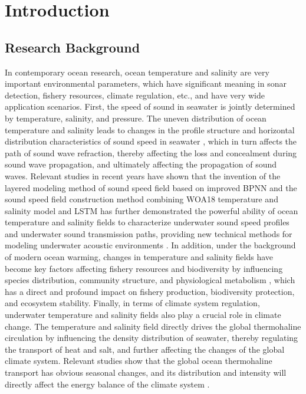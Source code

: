 \documentclass[webpdf,contemporary,large]{oup-authoring-template}
\begin{document}
\maketitle

\section{Introduction}

\subsection{Research Background}

In contemporary ocean research, ocean temperature and salinity are very important environmental parameters, which have significant meaning in sonar detection, fishery resources, climate regulation, etc., and have very wide application scenarios.
First, the speed of sound in seawater is jointly determined by temperature, salinity, and pressure. The uneven distribution of ocean temperature and salinity leads to changes in the profile structure and horizontal distribution characteristics of sound speed in seawater \cite{LiuYuLiangSanWeiHaiYangWenYanChangZhiNengYuBaoJiYingYongYanJiu2025}, which in turn affects the path of sound wave refraction, thereby affecting the loss and concealment during sound wave propagation, and ultimately affecting the propagation of sound waves. Relevant studies in recent years have shown that the invention of the layered modeling method of sound speed field based on improved BPNN and the sound speed field construction method combining WOA18 temperature and salinity model and LSTM has further demonstrated the powerful ability of ocean temperature and salinity fields to characterize underwater sound speed profiles and underwater sound transmission paths, providing new technical methods for modeling underwater acoustic environments \cite{WangZhaoYingJiYuGaiJinBPNNDeShengSuChangFenCengJianMo2024,TangAnJiYuShenDuXueXiLianHeWOA18WenYanMoXingGouJianShengSuChang2024}.
In addition, under the background of modern ocean warming, changes in temperature and salinity fields have become key factors affecting fishery resources and biodiversity by influencing species distribution, community structure, and physiological metabolism \cite{DongZhiGuoHaiYangNuanHuaBeiJingXiaHaiYangYuYeZiYuanJiQiShengWuXiangYingDeYanJiuJinZhan2024}, which has a direct and profound impact on fishery production, biodiversity protection, and ecosystem stability.
Finally, in terms of climate system regulation, underwater temperature and salinity fields also play a crucial role in climate change\cite{YangNingShengWoGuoHaiYangXinXingChanYeZhanLueGaiGuan2014}. The temperature and salinity field directly drives the global thermohaline circulation by influencing the density distribution of seawater, thereby regulating the transport of heat and salt, and further affecting the changes of the global climate system. Relevant studies show that the global ocean thermohaline transport has obvious seasonal changes, and its distribution and intensity will directly affect the energy balance of the climate system \cite{CuiWeiJiYuZaiFenXiShuJuDeQuanQiuHaiYangShuiTiHeReYanShuYunJiQiJiJieBianHua2023}.
\end{document}
